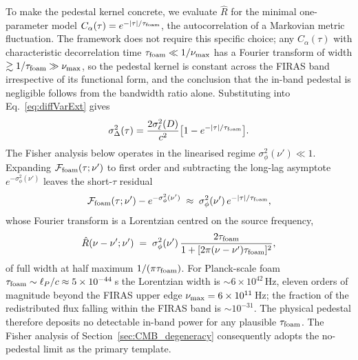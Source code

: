 \documentclass[aps,prd,onecolumn,amsmath,amssymb]{revtex4-2}
\begin{document}
To make the pedestal kernel concrete, we evaluate $\hat{R}$ for the
minimal one-parameter model $C_\alpha(\tau)=e^{-|\tau|/\tau_{\rm foam}}$,
the autocorrelation of a Markovian metric fluctuation.  The framework
does not require this specific choice; any $C_\alpha(\tau)$ with
characteristic decorrelation time $\tau_{\rm foam}\ll 1/\nu_{\rm max}$
has a Fourier transform of width $\gtrsim 1/\tau_{\rm foam}\gg
\nu_{\rm max}$, so the pedestal kernel is constant across the FIRAS
band irrespective of its functional form, and the conclusion that
the in-band pedestal is negligible follows from the bandwidth ratio
alone.  Substituting into Eq.~\eqref{eq:diffVarExt} gives
\begin{equation}
  \sigma_\Delta^2(\tau) = \frac{2\sigma_\ell^2(D)}{c^2}
    \bigl[1 - e^{-|\tau|/\tau_{\rm foam}}\bigr].
  \label{eq:sigmaDelta_exponential}
\end{equation}
The Fisher analysis below operates in the linearised regime
$\sigma_\phi^2(\nu')\ll 1$.  Expanding $\mathcal{F}_{\rm foam}(\tau;\nu')$
to first order and subtracting the long-lag asymptote
$e^{-\sigma_\phi^2(\nu')}$ leaves the short-$\tau$ residual
\begin{equation}
  \mathcal{F}_{\rm foam}(\tau;\nu') - e^{-\sigma_\phi^2(\nu')}
  \;\approx\; \sigma_\phi^2(\nu')\,e^{-|\tau|/\tau_{\rm foam}},
  \label{eq:Ffoam_residual_exponential}
\end{equation}
whose Fourier transform is a Lorentzian centred on the source
frequency,
\begin{equation}
  \hat{R}(\nu-\nu';\nu')
    \;=\; \sigma_\phi^2(\nu')\,
    \frac{2\tau_{\rm foam}}{1 + [2\pi(\nu-\nu')\tau_{\rm foam}]^2},
  \label{eq:R_lorentzian}
\end{equation}
of full width at half maximum $1/(\pi\tau_{\rm foam})$.  For Planck-scale foam
$\tau_{\rm foam}\sim\ell_P/c\approx 5\times 10^{-44}$\,s the
Lorentzian width is $\sim 6\times 10^{42}$\,Hz, eleven orders of
magnitude beyond the FIRAS upper edge $\nu_{\rm max}=6\times 10^{11}$\,Hz;
the fraction of the redistributed flux falling within the FIRAS band
is $\sim 10^{-31}$.  The physical pedestal therefore deposits no
detectable in-band power for any plausible $\tau_{\rm foam}$.  The
Fisher analysis of Section~\ref{sec:CMB_degeneracy} consequently
adopts the no-pedestal limit as the primary template.
\end{document}
